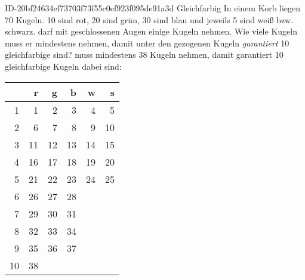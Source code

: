 \begin{exercise}
      {ID-20bf24634ef73703f73f55c0ef923f095de91a3d}
      {Gleichfarbig}
  \ifproblem\problem
    In einem Korb liegen 70 Kugeln. 10 sind rot, 20 sind grün, 30 sind blau
    und jeweils 5 sind weiß bzw. schwarz. \xya{} darf mit geschlossenen Augen
    einige Kugeln nehmen. Wie viele Kugeln muss er mindestens nehmen, damit
    unter den gezogenen Kugeln \emph{garantiert} 10 gleichfarbige sind?
  \fi
  \ifoutcome\outcome
    \xya{} muss mindestens 38 Kugeln nehmen, damit garantiert 10 gleichfarbige Kugeln
    dabei sind:
    \begin{center}
      \begin{tabular}{r|rrrrr}
          &  r &  g &  b &  w &  s \\
      \hline
         1 &  1 &  2 &  3 &  4 &  5 \\
         2 &  6 &  7 &  8 &  9 & 10 \\
         3 & 11 & 12 & 13 & 14 & 15 \\
         4 & 16 & 17 & 18 & 19 & 20 \\
         5 & 21 & 22 & 23 & 24 & 25 \\
      \hline
         6 & 26 & 27 & 28 &    &    \\
         7 & 29 & 30 & 31 &    &    \\
         8 & 32 & 33 & 34 &    &    \\
         9 & 35 & 36 & 37 &    &    \\
      \hline
        10 & 38 &    &    &    &    \\
      \hline
      \end{tabular}
    \end{center}
  \fi
\end{exercise}
